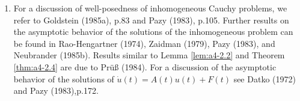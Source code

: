 \begin{enumerate}[label=\emph{Section \arabic*:}, wide]
\item For a discussion of well-posedness of inhomogeneous Cauchy problems, we refer to Goldstein (1985a), p.83 and Pazy (1983), p.105. 
Further results on the asymptotic behavior of the solutions of the inhomogeneous problem can be found in Rao-Hengartner (1974), Zaidman (1979), Pazy (1983), and Neubrander (1985b). 
Results similar to Lemma \ref{lem:a4-2.2} and Theorem \ref{thm:a4-2.4} are due to Prüß (1984). 
For a discussion of the asymptotic behavior of the solutions of $\dot{u}(t) = A(t)u(t) + F(t)$ see Datko (1972) and Pazy (1983),p.172.

\end{enumerate}


